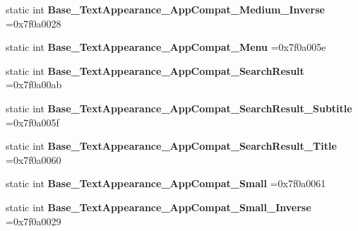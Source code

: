 \begin{DoxyCompactItemize}
\item 
\mbox{\label{classandroid_1_1support_1_1v7_1_1recyclerview_1_1R_1_1style_a720d36fefb07985c9d34f224e0194a58}} 
static int {\bfseries Base\+\_\+\+Text\+Appearance\+\_\+\+App\+Compat\+\_\+\+Medium\+\_\+\+Inverse} =0x7f0a0028
\item 
\mbox{\label{classandroid_1_1support_1_1v7_1_1recyclerview_1_1R_1_1style_a85e26afeee7d6f6b768d61122a94e9c7}} 
static int {\bfseries Base\+\_\+\+Text\+Appearance\+\_\+\+App\+Compat\+\_\+\+Menu} =0x7f0a005e
\item 
\mbox{\label{classandroid_1_1support_1_1v7_1_1recyclerview_1_1R_1_1style_a3319e03e72dc6f969f01661acf6b9813}} 
static int {\bfseries Base\+\_\+\+Text\+Appearance\+\_\+\+App\+Compat\+\_\+\+Search\+Result} =0x7f0a00ab
\item 
\mbox{\label{classandroid_1_1support_1_1v7_1_1recyclerview_1_1R_1_1style_afd00c3eb073c83c76a4731493448e458}} 
static int {\bfseries Base\+\_\+\+Text\+Appearance\+\_\+\+App\+Compat\+\_\+\+Search\+Result\+\_\+\+Subtitle} =0x7f0a005f
\item 
\mbox{\label{classandroid_1_1support_1_1v7_1_1recyclerview_1_1R_1_1style_aa1ba0d8a43f029baa1f79b66e44b500b}} 
static int {\bfseries Base\+\_\+\+Text\+Appearance\+\_\+\+App\+Compat\+\_\+\+Search\+Result\+\_\+\+Title} =0x7f0a0060
\item 
\mbox{\label{classandroid_1_1support_1_1v7_1_1recyclerview_1_1R_1_1style_a836c403b06d30823beadf6f19e8387ae}} 
static int {\bfseries Base\+\_\+\+Text\+Appearance\+\_\+\+App\+Compat\+\_\+\+Small} =0x7f0a0061
\item 
\mbox{\label{classandroid_1_1support_1_1v7_1_1recyclerview_1_1R_1_1style_a9ab0f6d078f81fb4807e7c80f27f19a4}} 
static int {\bfseries Base\+\_\+\+Text\+Appearance\+\_\+\+App\+Compat\+\_\+\+Small\+\_\+\+Inverse} =0x7f0a0029

\end{DoxyCompactItemize}
